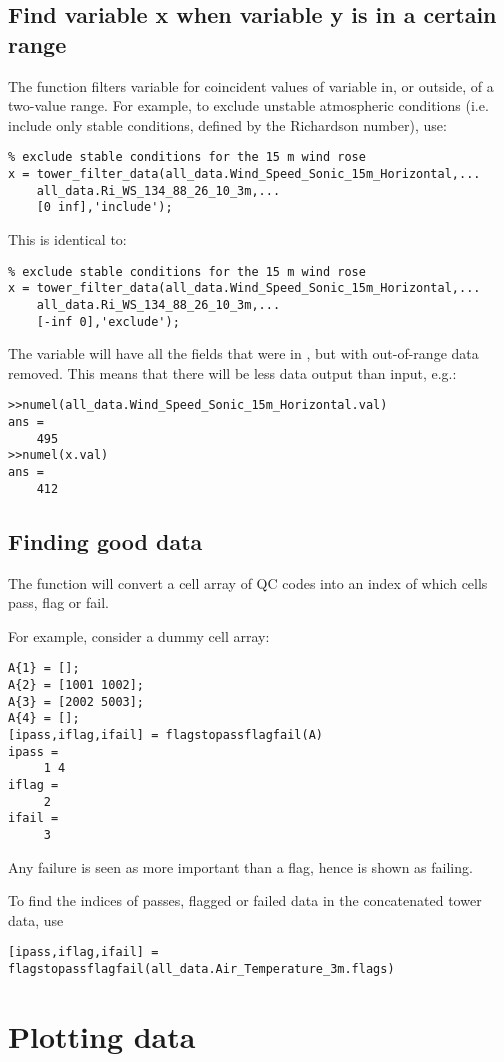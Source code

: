 \subsection[\mfunction{tower\_filter\_data()}]{Find variable x when variable y is in a certain range}
The function  filters variable  for coincident values of variable  in, or outside, of a two-value range. For example, to exclude unstable atmospheric conditions (i.e. include only stable conditions, defined by the Richardson number), use:

\begin{lstlisting}
% exclude stable conditions for the 15 m wind rose
x = tower_filter_data(all_data.Wind_Speed_Sonic_15m_Horizontal,...
    all_data.Ri_WS_134_88_26_10_3m,...
    [0 inf],'include');
\end{lstlisting}

This is identical to:

\begin{lstlisting}
% exclude stable conditions for the 15 m wind rose
x = tower_filter_data(all_data.Wind_Speed_Sonic_15m_Horizontal,...
    all_data.Ri_WS_134_88_26_10_3m,...
    [-inf 0],'exclude');
\end{lstlisting}

The variable  will have all the fields that were in , but with out-of-range data removed. This means that there will be less data output than input, e.g.:

\begin{lstlisting}
>>numel(all_data.Wind_Speed_Sonic_15m_Horizontal.val)
ans =
	495
>>numel(x.val)
ans =
	412
\end{lstlisting}

\subsection[\mfunction{flagstopassflagfail()}]{Finding good data}
The function  will convert a cell array of QC codes into an index of which cells pass, flag or fail.

For example, consider a dummy cell array:

\begin{lstlisting}
A{1} = [];
A{2} = [1001 1002];
A{3} = [2002 5003];
A{4} = [];
[ipass,iflag,ifail] = flagstopassflagfail(A)
ipass =
     1 4
iflag =
     2
ifail =
     3
\end{lstlisting}

Any failure is seen as more important than a flag, hence  is shown as failing.

To find the indices of passes, flagged or failed data in the concatenated tower data, use

\begin{lstlisting}
[ipass,iflag,ifail] = flagstopassflagfail(all_data.Air_Temperature_3m.flags)
\end{lstlisting}

\section{Plotting data}
